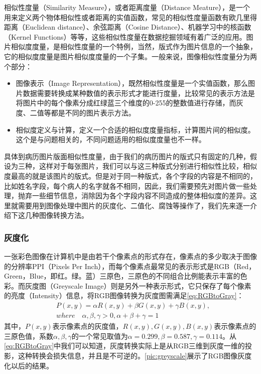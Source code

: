 相似性度量（Similarity Measure）\citep{lin1998information}，或者距离度量（Distance Meature），是一个用来定义两个物体相似性或者距离的实值函数\citep{singhal2001modern}，常见的相似性度量函数有欧几里得距离（Euclidean distance）\citep{wiki:Euclidean-distance}、余弦距离（Cosine Distance）\citep{wiki:Cosine-distance}、机器学习中的核函数（Kernel Functions）\citep{hofmann2008kernel}等等，这些相似性度量在数据挖掘领域有着广泛的应用\citep{tan2006introduction}。图片相似度度量，是相似性度量的一个特例，当然，版式作为图片信息的一个抽象，它的相似度度量是图片相似度度量的一个子集。一般来说，图像相似性度量分为两个部分\citep{goldberger2003efficient}：
\begin{itemize}
  \item 图像表示（Image Representation），既然相似性度量是一个实值函数，那么图片数据需要转换成某种数值的表示形式才能进行度量，比较常见的表示方法是将图片中的每个像素分成红绿蓝三个维度的0-255的整数值进行存储，而灰度、二值等都是不同的图片表示方法。
  \item 相似度定义与计算，定义一个合适的相似度度量指标，计算图片间的相似度。这个是与问题相关的，不同问题适用的相似度度量也不一样。
\end{itemize}
具体到病历图片版面相似性度量，由于我们的病历图片的版式只有固定的几种，假设为三种，这样对于每张图片，我们可以与这三种版式分别进行相似性比较，相似度最高的就是该图片的版式。但是对于同一种版式，各个字段的内容是不相同的，比如姓名字段，每个病人的名字就各不相同，因此，我们需要预先对图片做一些处理，抛弃一些细节信息，消除因为各个字段内容不同造成的整体相似度的差异。这里就需要用到图像处理中图片的灰度化、二值化、腐蚀等操作了，我们先来逐一介绍下这几种图像转换方法。

\subsubsection*{灰度化}
\label{sub:灰度化}
一张彩色图像在计算机中是由若干个像素点的形式存在，像素点的多少取决于图像的分辨率PPI（Pixels Per Inch），而每个像素点最常见的表示形式是RGB（Red，Green，Blue，即红。绿。蓝）三原色，三原色的不同组合比例能表示丰富的色彩。而灰度图（Greyscale Image）则是另外一种表示形式，它只保存了每个像素的亮度（Intensity）信息，将RGB图像转换为灰度图需满足\autoref{eq:RGBtoGray}：
\begin{equation} \label{eq:RGBtoGray}
		\begin{split}
& P(x,y) = \alpha R(x,y) + \beta G(x,y) + \gamma B(x,y),  \\
& where \quad \alpha,\beta,\gamma > 0,\alpha + \beta + \gamma = 1
		\end{split}
\end{equation}
其中，$P(x,y)$表示像素点的灰度值，$R(x,y),G(x,y),B(x,y)$表示像素点的三原色值，系数$\alpha,\beta,\gamma$的一个常见取值为$\alpha=0.299,\beta=0.587,\gamma=0.114$。从\autoref{eq:RGBtoGray}中我们可以知道，灰度转换实际上是从RGB三维到灰度一维的投影，这种转换会损失信息，并且是不可逆的。\autoref{pic:greyscale}展示了RGB图像灰度化以后的结果。

